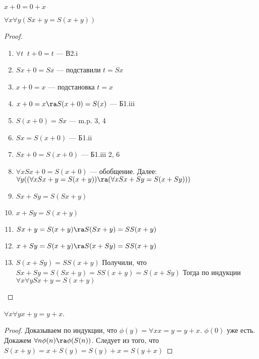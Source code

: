
\begin{corollary}
    \(x + 0 = 0 + x\)
\end{corollary}

\begin{lemma}
    \(\forall x \forall y (Sx + y = S(x + y))\)
\end{lemma}
\begin{proof}
    \begin{enumerate}
        \item \(\forall t\;\;t + 0 = t\) --- В2.i
        \item \(Sx + 0 = Sx\) --- подставили \(t = Sx\)
        \item \(x + 0 = x\) --- подстановка \(t = x\)
        \item \(x + 0 = x \ra S(x + 0) = S(x)\) --- Б1.iii
        \item \(S(x + 0) = Sx\) --- m.p. 3, 4
        \item \(Sx = S(x + 0)\) --- Б1.ii
        \item \(Sx + 0 = S(x + 0)\) --- Б1.iii 2, 6
        \item \(\forall x Sx + 0 = S(x + 0)\) --- обобщение. Далее:
        \(\forall y((\forall x Sx + y = S(x + y)) \ra (\forall x Sx + Sy = S(x + Sy)))\)
        \item \(Sx + Sy = S(Sx + y)\)
        \item \(x + Sy = S(x + y)\)
        \item \(Sx + y = S(x + y) \ra S(Sx + y) = SS(x + y)\)
        \item \(x + Sy = S(x + y) \ra S(x + Sy) = SS(x + y)\)
        \item \(S(x + Sy) = SS(x + y)\)
        Получили, что \(Sx + Sy = S(Sx + y) = SS(x + y) = S(x + Sy)\)
        Тогда по индукции \(\forall x \forall y Sx + y = S(x + y)\)
    \end{enumerate}
\end{proof}

\begin{proposition}
    \(\forall x \forall y x + y = y + x\).
\end{proposition}
\begin{proof}
    Доказываем по индукции, что \(\phi(y) = \forall x x = y = y + x\). \(\phi(0)\) уже есть. Докажем \(\forall n \phi(n) \ra \phi(S(n))\). Следует из того, что \(S(x + y) = x + S(y) = S(y) + x = S(y + x)\)
\end{proof}

